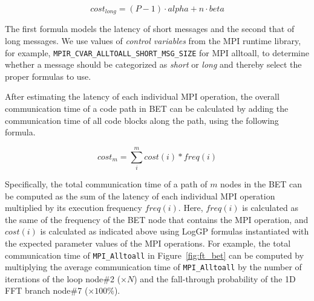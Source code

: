 \begin{equation}
cost_{long} = (P-1)\cdot alpha + n\cdot beta
\end{equation}

The first formula models the latency of short messages and
the second that of long messages.  We use values of \emph{control
  variables} from the MPI runtime library, for example,
\texttt{MPIR\_CVAR\_ALLTOALL\_SHORT\_MSG\_SIZE} for MPI alltoall, to
determine whether a message should be categorized as {\em short} or
{\em long} and thereby select the proper formulas to use.

After estimating the latency of each individual MPI operation,
the overall communication time of a code path in BET can be calculated
by adding the communication time of all code blocks along the path,
using the following formula.

\begin{equation}
  cost_{m} = \sum\limits_{i}^{m} cost(i) * freq(i)
\end{equation}

Specifically, the total communication time of a path of $m$ nodes in
the BET can be computed as the sum of the latency of each
individual MPI operation multiplied by its execution frequency
$freq(i)$.  Here, $freq(i)$ is calculated as the same of the frequency of the BET node that contains the MPI operation, and
$cost(i)$ is calculated as indicated above using LogGP formulas
instantiated with the expected parameter values of the MPI operations.
For example, the total communication time of \texttt{MPI\_Alltoall} in
Figure~\ref{fig:ft_bet} can be computed by multiplying the average
communication time of \texttt{MPI\_Alltoall} by the number of
iterations of the loop node\#2 ($\times N$) and the fall-through
probability of the 1D FFT branch node\#7 ($\times 100\%$).
